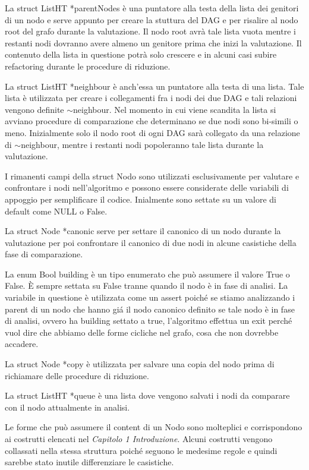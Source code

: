 \documentclass[12pt,a4paper,openright,twoside]{report}
\begin{document}
La struct ListHT *parentNodes \`e una puntatore alla testa della lista dei genitori di un nodo e serve appunto per creare la stuttura del DAG e per risalire al nodo root del grafo durante la valutazione. Il nodo root avr\`a tale lista vuota mentre i restanti nodi dovranno avere almeno un genitore prima che inizi la valutazione. Il contenuto della lista in questione potr\`a solo crescere e in alcuni casi subire refactoring durante le procedure di riduzione.

La struct ListHT *neighbour \`e anch'essa un puntatore alla testa di una lista. Tale lista \`e utilizzata per creare i collegamenti fra i nodi dei due DAG e tali relazioni vengono definite $\sim$neighbour. Nel momento in cui viene scandita la lista si avviano procedure di comparazione che determinano se due nodi sono bi-simili o meno. \newline
Inizialmente solo il nodo root di ogni DAG sar\`a collegato da una relazione di $\sim$neighbour, mentre i restanti nodi popoleranno tale lista durante la valutazione.

I rimanenti campi della struct Nodo sono utilizzati esclusivamente per valutare e confrontare i nodi nell'algoritmo e possono essere considerate delle variabili di appoggio per semplificare il codice. Inialmente sono settate su un valore di default come NULL o False.

La struct Node *canonic serve per settare il canonico di un nodo durante la valutazione per poi confrontare il canonico di due nodi in alcune casistiche della fase di comparazione.

La enum Bool building \`e un tipo enumerato che pu\`o assumere il valore True o False. \`E sempre settata su False tranne quando il nodo \`e in fase di analisi.
La variabile in questione \`e utilizzata come un assert poich\'e se stiamo analizzando i parent di un nodo che hanno gi\'a il nodo canonico definito se tale nodo \`e in fase di analisi, ovvero ha building settato a true,  l'algoritmo effettua un exit perch\'e vuol dire che abbiamo delle forme cicliche nel grafo, cosa che non dovrebbe accadere.

La struct Node *copy \`e utilizzata per salvare una copia del nodo prima di richiamare delle procedure di riduzione.

La struct ListHT *queue \`e una lista dove vengono salvati i nodi da comparare con il nodo attualmente in analisi.\newline


Le forme che pu\`o assumere il content di un Nodo sono molteplici e corrispondono ai costrutti elencati nel \textit{Capitolo 1 Introduzione}. Alcuni costrutti vengono collassati nella stessa struttura poich\'e seguono le medesime regole e quindi sarebbe stato inutile differenziare le casistiche. 
\end{document}
